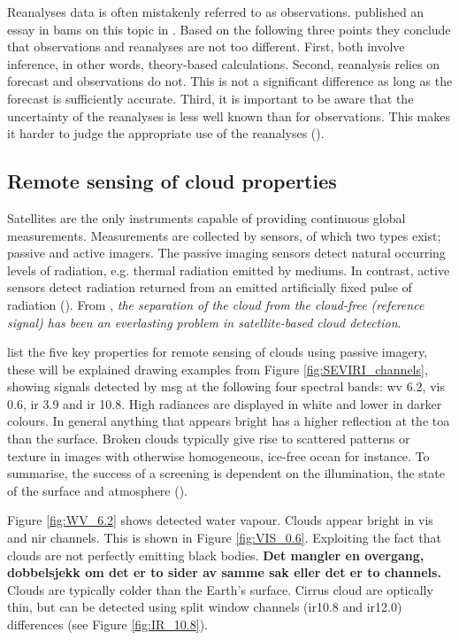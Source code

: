 Reanalyses data is often mistakenly referred to as observations. \citeauthor{Parker2016ReanalysesDifference} published an essay in \acrfull{bams} on this topic in \citeyear{Parker2016ReanalysesDifference}. Based on the following three points they conclude that observations and reanalyses are not too different. First, both involve inference, in other words, theory-based calculations. Second, reanalysis relies on forecast and observations do not. This is not a significant difference as long as the forecast is sufficiently accurate. Third, it is important to be aware that the uncertainty of the reanalyses is less well known than for observations. This makes it harder to judge the appropriate use of the reanalyses (\cite{Parker2016ReanalysesDifference}). 

\subsection{Remote sensing of cloud properties}
Satellites are the only instruments capable of providing continuous global measurements.
Measurements are collected by sensors, of which two types exist; passive and active imagers. The passive imaging sensors detect natural occurring levels of radiation, e.g. thermal radiation emitted by mediums. In contrast, active sensors  detect radiation returned from an emitted artificially fixed pulse of radiation (\cite{Stephens2018CloudsatSystem}). From \cite{Stockli2019CloudApplications}, \textit{the separation of the cloud from the cloud-free (reference signal) has been an everlasting problem in satellite-based cloud detection}.


 list the five key properties for remote sensing of clouds using passive imagery, these will be explained drawing examples from Figure \ref{fig:SEVIRI_channels}, showing signals detected by \acrshort{msg} at the following four spectral bands: \acrshort{wv} 6.2, \acrshort{vis} 0.6, \acrshort{ir} 3.9 and \acrshort{ir} 10.8. High radiances are displayed in white and lower in darker colours. In general anything that appears bright has a higher reflection at the \acrshort{toa} than the surface.  Broken clouds typically give rise to scattered patterns or texture in images with otherwise homogeneous, ice-free ocean for instance. To summarise, the success of a screening is dependent on the illumination, the state of the surface and atmosphere (\cite{Karlsson2015AdvancingData}).  

Figure \ref{fig:WV_6.2} shows detected water vapour. Clouds appear bright in \acrfull{vis} and \acrfull{nir} channels. This is shown in Figure \ref{fig:VIS_0.6}. Exploiting the fact that clouds are not perfectly emitting black bodies. \textbf{Det mangler en overgang, dobbelsjekk om det er to sider av samme sak eller det er to channels.}
Clouds are typically colder than the Earth's surface. Cirrus cloud are optically thin, but can be detected using split window channels (\acrshort{ir}10.8 and \acrshort{ir}12.0) differences (see Figure \ref{fig:IR_10.8}). 

